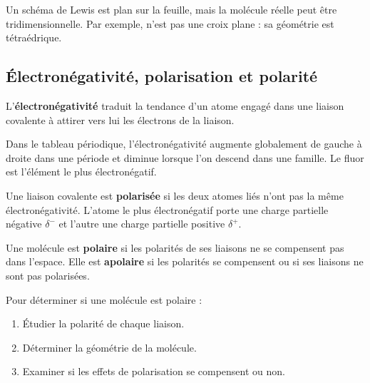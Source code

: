 \documentclass[11pt,a4paper]{article}
\begin{document}
\begin{erreurbox}
Un schéma de Lewis est plan sur la feuille, mais la molécule réelle peut être tridimensionnelle. Par exemple,  n'est pas une croix plane : sa géométrie est tétraédrique.
\end{erreurbox}

\subsection{Électronégativité, polarisation et polarité}

\begin{definitionbox}
L'\textbf{électronégativité} traduit la tendance d'un atome engagé dans une liaison covalente à attirer vers lui les électrons de la liaison.
\end{definitionbox}

\begin{retenirbox}
Dans le tableau périodique, l'électronégativité augmente globalement de gauche à droite dans une période et diminue lorsque l'on descend dans une famille. Le fluor est l'élément le plus électronégatif.
\end{retenirbox}

\begin{definitionbox}
Une liaison covalente est \textbf{polarisée} si les deux atomes liés n'ont pas la même électronégativité. L'atome le plus électronégatif porte une charge partielle négative $\delta^-$ et l'autre une charge partielle positive $\delta^+$.
\end{definitionbox}

\begin{definitionbox}
Une molécule est \textbf{polaire} si les polarités de ses liaisons ne se compensent pas dans l'espace. Elle est \textbf{apolaire} si les polarités se compensent ou si ses liaisons ne sont pas polarisées.
\end{definitionbox}

\begin{methodbox}
Pour déterminer si une molécule est polaire :
\begin{enumerate}
\item Étudier la polarité de chaque liaison.
\item Déterminer la géométrie de la molécule.
\item Examiner si les effets de polarisation se compensent ou non.
\end{enumerate}
\end{methodbox}
\end{document}
